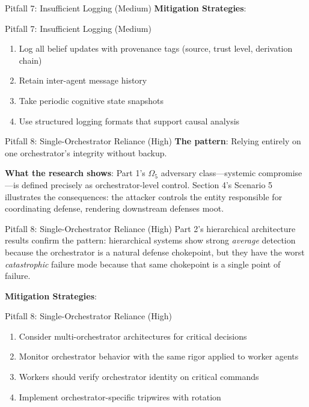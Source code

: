 \documentclass[
  ignorenonframetext,
]{beamer}
\providecommand{\tightlist}{%
  \setlength{\itemsep}{0pt}\setlength{\parskip}{0pt}}
\begin{document}
\begin{frame}[allowframebreaks]{Pitfall 7: Insufficient Logging
(Medium)}
\textbf{Mitigation Strategies}:

\end{frame}

\begin{frame}[allowframebreaks]{Pitfall 7: Insufficient Logging
(Medium)}
\begin{enumerate}
\tightlist
\item
  Log all belief updates with provenance tags (source, trust level,
  derivation chain)
\item
  Retain inter-agent message history
\item
  Take periodic cognitive state snapshots
\item
  Use structured logging formats that support causal analysis
\end{enumerate}
\end{frame}

\begin{frame}[allowframebreaks]{Pitfall 8: Single-Orchestrator Reliance
(High)}
\protect{}\label{pitfall-8-single-orchestrator-reliance-high}
\textbf{The pattern}: Relying entirely on one orchestrator's integrity
without backup.

\textbf{What the research shows}: Part 1's \(\Omega_5\) adversary
class---systemic compromise---is defined precisely as orchestrator-level
control. Section 4's Scenario 5 illustrates the consequences: the
attacker controls the entity responsible for coordinating defense,
rendering downstream defenses moot.

\end{frame}

\begin{frame}[allowframebreaks]{Pitfall 8: Single-Orchestrator Reliance
(High)}
Part 2's hierarchical architecture results confirm the pattern:
hierarchical systems show strong \emph{average} detection because the
orchestrator is a natural defense chokepoint, but they have the worst
\emph{catastrophic} failure mode because that same chokepoint is a
single point of failure.

\textbf{Mitigation Strategies}:

\end{frame}

\begin{frame}[allowframebreaks]{Pitfall 8: Single-Orchestrator Reliance
(High)}
\begin{enumerate}
\tightlist
\item
  Consider multi-orchestrator architectures for critical decisions
\item
  Monitor orchestrator behavior with the same rigor applied to worker
  agents
\item
  Workers should verify orchestrator identity on critical commands
\item
  Implement orchestrator-specific tripwires with rotation
\end{enumerate}
\end{frame}
\end{document}
